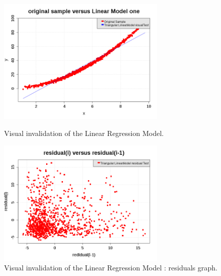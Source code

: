                  \begin{figure}[H]
                   \begin{minipage}{8cm}
                     \begin{center}
                       \includegraphics[width=8cm]{Figures/linearRegression_GraphWrong.png}
                       \caption{Visual invalidation of the Linear Regression Model.}
                       \label{LMWrong}
                     \end{center}
                   \end{minipage}
                   \hfill
                   \begin{minipage}{8cm}
                     \begin{center}
                       \includegraphics[width=8cm]{Figures/linearRegression_residualGraphWrong.png}
                       \caption{Visual invalidation of the Linear Regression Model : residuals graph.}
                       \label{LMResidualWrong}
                     \end{center}
                   \end{minipage}
                 \end{figure}


